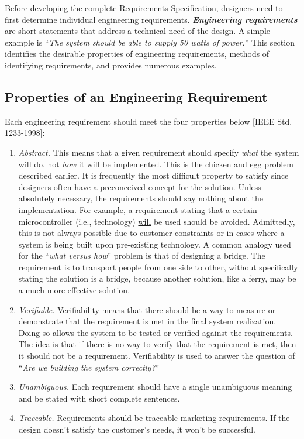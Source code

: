 Before developing the complete Requirements Specification, designers
need to first determine individual engineering requirements.
\emph{\textbf{Engineering requirements}} are short statements that
address a technical need of the design. A simple example is ``\emph{The
system should be able to supply 50 watts of power.}'' This section
identifies the desirable properties of engineering requirements, methods
of identifying requirements, and provides numerous examples.

\subsection{Properties of an Engineering Requirement}
\label{section:properties-of-an-engineering-requirement}

Each engineering requirement should meet the four properties below
{[}IEEE Std. 1233-1998{]}:

\begin{enumerate}
\def\labelenumi{\arabic{enumi})}
\item
  \emph{Abstract.} This means that a given requirement should specify
  \emph{what} the system will do, not \emph{how} it will be implemented.
  This is the chicken and egg problem described earlier. It is
  frequently the most difficult property to satisfy since designers
  often have a preconceived concept for the solution. Unless absolutely
  necessary, the requirements should say nothing about the
  implementation. For example, a requirement stating that a certain
  microcontroller (i.e., technology) \ul{will} be used should be
  avoided. Admittedly, this is not always possible due to customer
  constraints or in cases where a system is being built upon
  pre-existing technology. A common analogy used for the ``\emph{what
  versus how}'' problem is that of designing a bridge. The requirement
  is to transport people from one side to other, without specifically
  stating the solution is a bridge, because another solution, like a
  ferry, may be a much more effective solution.
\item
  \emph{Verifiable.} Verifiability means that there should be a way to
  measure or demonstrate that the requirement is met in the final system
  realization. Doing so allows the system to be tested or verified
  against the requirements. The idea is that if there is no way to
  verify that the requirement is met, then it should not be a
  requirement. Verifiability is used to answer the question of
  ``\emph{Are we building the system correctly?}''
\item
  \emph{Unambiguous.} Each requirement should have a single unambiguous
  meaning and be stated with short complete sentences.
\item
  \emph{Traceable.} Requirements should be traceable marketing
  requirements. If the design doesn't satisfy the customer's needs, it
  won't be successful.
\end{enumerate}

